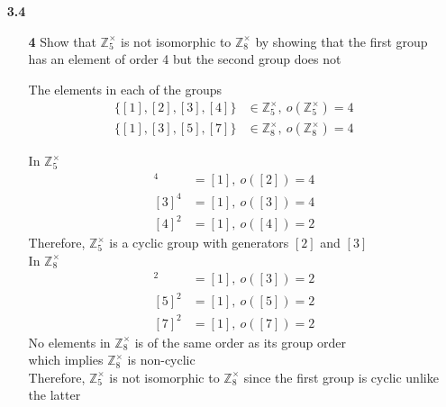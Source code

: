 \documentclass[paper=usletter, fontsize=12pt]{article}
\begin{document}
    \vspace{-0.2in}

    \begin{itemize}

        \item[\textbf{3.4}]
        \begin{itemize}

            \item[\textbf{4}] Show that $\mathbb{Z}_{5}^{\times}$ is not
            isomorphic to $\mathbb{Z}_{8}^{\times}$ by showing that the first
            group has an element of order 4 but the second group does not
            \begin{cproof}

                The elements in each of the groups
                \begin{align*}
                    \{[1], [2], [3], [4]\} & \in \mathbb{Z}_{5}^{\times},\ o(\mathbb{Z}_{5}^{\times}) = 4\\
                    \{[1], [3], [5], [7]\} & \in \mathbb{Z}_{8}^{\times},\ o(\mathbb{Z}_{8}^{\times}) = 4
                \end{align*}

                In $\mathbb{Z}_{5}^{\times}$
                \begin{align*}
                    [2]^4 &= [1], \ o([2]) = 4\\
                    [3]^4 &= [1], \ o([3]) = 4\\
                    [4]^2 &= [1], \ o([4]) = 2
                \end{align*}
                Therefore, $\mathbb{Z}_{5}^{\times}$ is a cyclic group with generators $[2]$ and $[3]$\\
                In $\mathbb{Z}_{8}^{\times}$
                \begin{align*}
                    [3]^2 &= [1], \ o([3]) = 2\\
                    [5]^2 &= [1], \ o([5]) = 2\\
                    [7]^2 &= [1], \ o([7]) = 2
                \end{align*}
                No elements in $\mathbb{Z}_{8}^{\times}$ is of the same order as its group order\\
                which implies $\mathbb{Z}_{8}^{\times}$ is non-cyclic\\
                Therefore, $\mathbb{Z}_{5}^{\times}$ is not isomorphic to
                $\mathbb{Z}_{8}^{\times}$ since the first group is cyclic
                unlike the latter \qedhere


\end{cproof}
\end{itemize}
\end{itemize}
\end{document}
